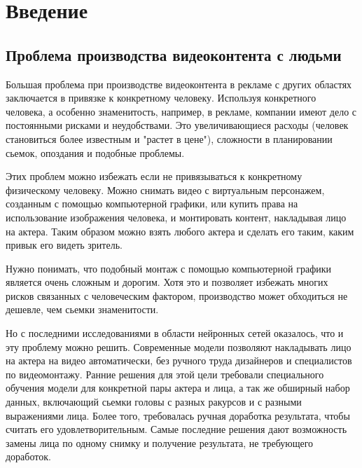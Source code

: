 \section{Введение}

\subsection{Проблема производства видеоконтента с людьми}

Большая проблема при производстве видеоконтента в рекламе с других областях заключается в привязке к конкретному человеку. Используя конкретного человека, а особенно знаменитость, например, в рекламе, компании имеют дело с постоянными рисками и неудобствами. Это увеличивающиеся расходы (человек становиться более известным и "растет в цене"), сложности в планировании сьемок, опоздания и подобные проблемы.

Этих проблем можно избежать если не привязываться к конкретному физическому человеку. Можно снимать видео с виртуальным персонажем, созданным с помощью компьютерной графики, или купить права на использование изображения человека, и монтировать контент, накладывая лицо на актера. Таким образом можно взять любого актера и сделать его таким, каким привык его видеть зритель.

Нужно понимать, что подобный монтаж с помощью компьютерной графики является очень сложным и дорогим. Хотя это и позволяет избежать многих рисков связанных с человеческим фактором, производство может обходиться не дешевле, чем сьемки знаменитости.

Но с последними исследованиями в области нейронных сетей оказалось, что и эту проблему можно решить. Современные модели позволяют накладывать лицо на актера на видео автоматически, без ручного труда дизайнеров и специалистов по видеомонтажу. Ранние решения для этой цели требовали специального обучения модели для конкретной пары актера и лица, а так же обширный набор данных, включающий сьемки головы с разных ракурсов и с разными выражениями лица. Более того, требовалась ручная доработка результата, чтобы считать его удовлетворительным. Самые последние решения дают возможность замены лица по одному снимку и получение результата, не требующего доработок.